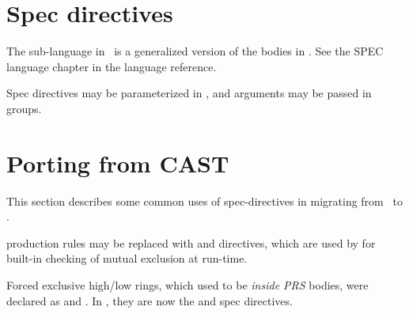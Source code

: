 
\section{Spec directives}
\label{sec:spec}

The  sub-language in \hac\ is a generalized version
of the  bodies in \CAST.  
See the SPEC language chapter in the  language reference.  

Spec directives may be parameterized in \hac, 
and arguments may be passed in groups. 

\section{Porting from CAST}
\label{sec:spec:porting}

This section describes some common uses of spec-directives
in migrating from \CAST\ to \hac.  

 production rules may be replaced 
with  and  directives, 
which are used by  for built-in checking
of mutual exclusion at run-time.  

Forced exclusive high/low rings, 
which used to be \emph{inside PRS} bodies, 
were declared as  and .  
In \hac, they are now the  and  
spec directives.  

